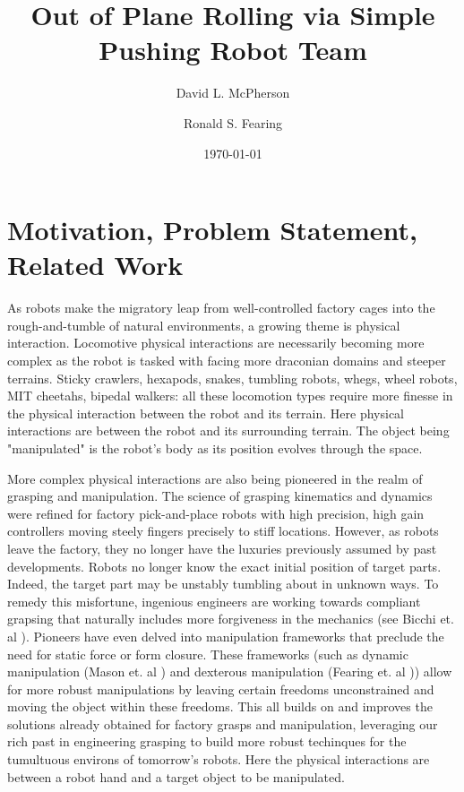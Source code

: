 \documentclass[runningheads,a4paper]{llncs}
\title{Out of Plane Rolling via Simple Pushing Robot Team}
\author{David L. McPherson \and Ronald S. Fearing}
\institute{Biomimetic Millisystems Lab \\
University of California Berkeley \\
Department of Electrical Engineering and Computer Science
}
\date{\today}
\begin{document}
\maketitle

\section{Motivation, Problem Statement, Related Work}

As robots make the migratory leap from well-controlled factory cages into the rough-and-tumble of natural environments, a growing theme is physical interaction.
Locomotive physical interactions are necessarily becoming more complex as the robot is tasked with facing more draconian domains and steeper terrains.
Sticky crawlers, hexapods, snakes, tumbling robots, whegs, wheel robots, MIT cheetahs, bipedal walkers: all these locomotion types require more finesse in the physical interaction between the robot and its terrain.
Here physical interactions are between the robot and its surrounding terrain.
The object being "manipulated" is the robot's body as its position evolves through the space.

More complex physical interactions are also being pioneered in the realm of grasping and manipulation.
The science of grasping kinematics and dynamics were refined for factory pick-and-place robots with high precision, high gain controllers moving steely fingers precisely to stiff locations.
However, as robots leave the factory, they no longer have the luxuries previously assumed by past developments.
Robots no longer know the exact initial position of target parts.
Indeed, the target part may be unstably tumbling about in unknown ways.
To remedy this misfortune, ingenious engineers are working towards compliant grapsing that naturally includes more forgiveness in the mechanics (see Bicchi et. al \cite{BicchiCompliant}).
Pioneers have even delved into manipulation frameworks that preclude the need for static force or form closure.
These frameworks (such as dynamic manipulation (Mason et. al \cite{Lynch01011999}) and dexterous manipulation (Fearing et. al \cite{fearing1986simplified})) allow for more robust manipulations by leaving certain freedoms unconstrained and moving the object within these freedoms.
This all builds on and improves the solutions already obtained for factory grasps and manipulation, leveraging our rich past in engineering grasping to build more robust techinques for the tumultuous environs of tomorrow's robots.
Here the physical interactions are between a robot hand and a target object to be manipulated.
\end{document}
